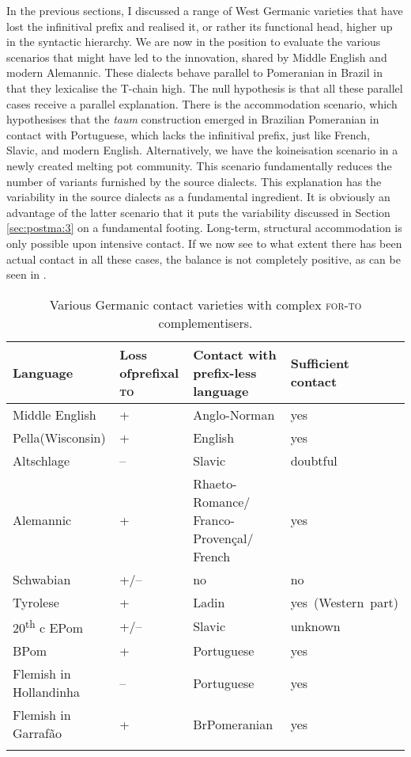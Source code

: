 \documentclass[output=paper,hidelinks,draftmode]{langscibook}
\begin{document}
In the previous sections, I discussed a range of West Germanic varieties that have lost the infinitival prefix and realised it, or rather its functional head, higher up in the syntactic hierarchy. We are now in the position to evaluate the various scenarios that might have led to the innovation, shared by Middle English and modern Alemannic. These dialects behave parallel to Pomeranian in Brazil in that they lexicalise the T-chain high. The null hypothesis is that all these parallel cases receive a parallel explanation. There is the accommodation scenario, which hypothesises that the \textit{taum} construction emerged in Brazilian Pomeranian in contact with Portuguese, which lacks the infinitival prefix, just like French, Slavic, and modern English. Alternatively, we have the koineisation scenario in a newly created melting pot community. This scenario fundamentally reduces the number of variants furnished by the source dialects. This explanation has the variability in the source dialects as a fundamental ingredient. It is obviously an advantage of the latter scenario that it puts the variability discussed in Section \ref{sec:postma:3} on a fundamental footing. Long-term, structural accommodation is only possible upon intensive contact. If we now see to what extent there has been actual contact in all these cases, the balance is not completely positive, as can be seen in .


\begin{table}
\small
	\begin{tabularx}{\textwidth}{lp{1.8cm}Ql}
		\lsptoprule
		Language & Loss of\newline prefixal \textsc{to} & Contact with prefix-less language & Sufficient contact\\
		\midrule
		Middle English & + & Anglo-Norman & yes\\
		Pella(Wisconsin) & + & English & yes\\
		Altschlage & – & Slavic & doubtful\\
		Alemannic & + & Rhaeto-Romance/ Franco-Provençal/ French & yes\\
		Schwabian & +/– & no & no\\
		Tyrolese & + & Ladin & \mbox{yes (Western part)}\\
		20\textsuperscript{th} c EPom & +/– & Slavic & unknown\\
		BPom & + & Portuguese & yes\\
		Flemish in Hollandinha & – & Portuguese & yes\\
		Flemish in Garraf\~{a}o & + & BrPomeranian & yes\\
		\lspbottomrule
	\end{tabularx}
	
\caption{Various Germanic contact varieties with complex \textsc{for-to} complementisers.}
\label{tab:postma:4}
\end{table}
\end{document}
